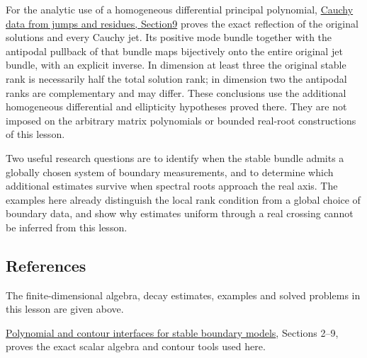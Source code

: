 \documentclass[
  11pt,
]{article}
\begin{document}
For the analytic use of a homogeneous differential principal polynomial,
\href{calderon-cauchy-data.pdf\#section*.57}{Cauchy data from jumps and
residues, Section9} proves the exact reflection of the original
solutions and every Cauchy jet. Its positive mode bundle together with
the antipodal pullback of that bundle maps bijectively onto the entire
original jet bundle, with an explicit inverse. In dimension at least
three the original stable rank is necessarily half the total solution
rank; in dimension two the antipodal ranks are complementary and may
differ. These conclusions use the additional homogeneous differential
and ellipticity hypotheses proved there. They are not imposed on the
arbitrary matrix polynomials or bounded real-root constructions of this
lesson.

Two useful research questions are to identify when the stable bundle
admits a globally chosen system of boundary measurements, and to
determine which additional estimates survive when spectral roots
approach the real axis. The examples here already distinguish the local
rank condition from a global choice of boundary data, and show why
estimates uniform through a real crossing cannot be inferred from this
lesson.

\subsection{References}\label{references}

The finite-dimensional algebra, decay estimates, examples and solved
problems in this lesson are given above.

\href{stable-prerequisite-bridges.pdf}{Polynomial and contour interfaces
for stable boundary models}, Sections 2--9, proves the exact scalar
algebra and contour tools used here.
\end{document}
